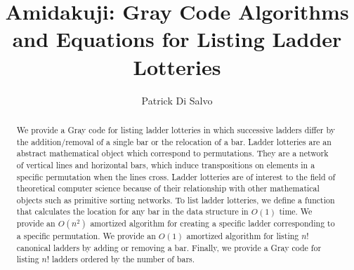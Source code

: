 \documentclass[11pt,dvipsnames]{gthesis}
\begin{document}
\title{Amidakuji: Gray Code Algorithms and Equations for Listing Ladder Lotteries}

\author{Patrick Di Salvo}







\maketitle


\begin{abstract}

We provide a Gray code for listing ladder lotteries in which successive ladders differ by the addition/removal of a single bar or 
the relocation of a bar. Ladder lotteries are an abstract mathematical object which correspond to permutations. They are a network of vertical lines 
and horizontal bars, which induce transpositions on elements in a specific permutation when the lines cross. 
Ladder lotteries are of interest to the field of theoretical computer science because of their relationship with other 
mathematical objects such as primitive sorting networks. 
To list ladder lotteries, we define a function that calculates the location for any bar in the data structure in $O(1)$ time. We provide an $O(n^2)$ amortized 
algorithm for creating a specific ladder corresponding to a specific permutation. We provide an $O(1)$ amortized algorithm for listing 
 $n!$ canonical ladders by adding or removing a bar. Finally, we provide a Gray code for listing $n!$ ladders ordered by 
 the number of bars. 

\medskip

\small
\centering

\end{abstract}

\begin{frontmatter}





\tableofcontents
\listoftables
\listoffigures

\end{frontmatter}

\dsp


\ssp
  
  
\dsp


\appendix

\end{document}
